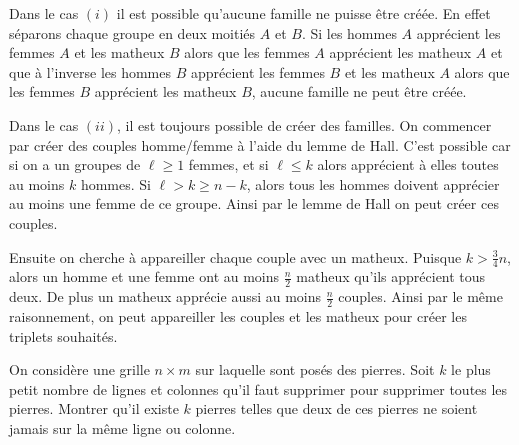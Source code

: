 \begin{sol}

Dans le cas $(i)$ il est possible qu'aucune famille ne puisse être créée. En effet séparons chaque groupe en deux moitiés $A$ et $B$. Si les hommes $A$ apprécient les femmes $A$ et les matheux $B$ alors que les femmes $A$ apprécient les matheux $A$ et que à l'inverse les hommes $B$ apprécient les femmes $B$ et les matheux $A$ alors que les femmes $B$ apprécient les matheux $B$, aucune famille ne peut être créée.

\medskip

Dans le cas $(ii)$, il est toujours possible de créer des familles. On commencer par créer des couples homme/femme à l'aide du lemme de Hall. C'est possible car si on a un groupes de $\ell\geq 1$ femmes, et si $\ell\leq k$ alors apprécient à elles toutes au moins $k$ hommes. Si $\ell>k\geq n-k$, alors tous les hommes doivent apprécier au moins une femme de ce groupe. Ainsi par le lemme de Hall on peut créer ces couples.

\medskip
Ensuite on cherche à appareiller chaque couple avec un matheux. Puisque $k>\frac{3}{4}n$, alors un homme et une femme ont au moins $\frac{n}{2}$ matheux qu'ils apprécient tous deux. De plus un matheux apprécie aussi au moins $\frac{n}{2}$ couples. Ainsi par le même raisonnement, on peut appareiller les couples et les matheux pour créer les triplets souhaités.
\end{sol}

\begin{exo}
On considère une grille $n\times m$ sur laquelle sont posés des pierres. Soit $k$ le plus petit nombre de lignes et colonnes qu'il faut supprimer pour supprimer toutes les pierres. Montrer qu'il existe $k$ pierres telles que deux de ces pierres ne soient jamais sur la même ligne ou colonne.
\end{exo}

